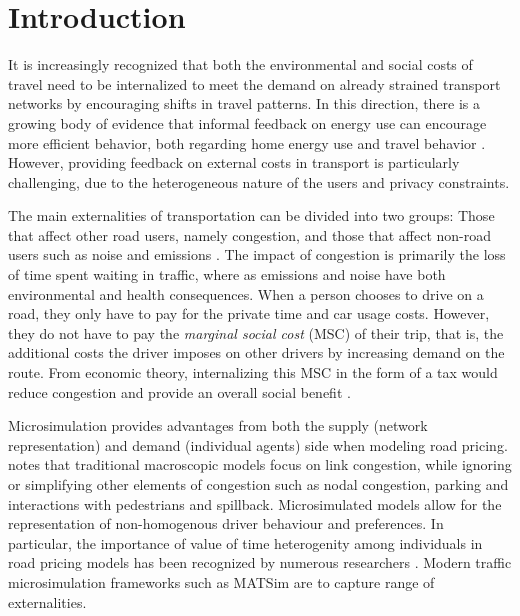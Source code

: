 \section{Introduction}

It is increasingly recognized that both the environmental and social costs of travel need to be internalized to meet the demand on already strained transport networks by encouraging shifts in travel patterns. 
In this direction, there is a growing body of evidence that informal feedback on energy use can encourage more efficient behavior, both regarding home energy use \citep{faruqui2010impact} and travel behavior \citep{taniguchi2003psychological, fujii2006determinants}.
However, providing feedback on external costs in transport is particularly challenging, due to the heterogeneous nature of the users and privacy constraints.

The main externalities of transportation can be divided into two groups: Those that affect other road users, namely congestion, and those that affect non-road users such as noise and emissions \citep{button2004rationale}.
The impact of congestion is primarily the loss of time spent waiting in traffic, where as emissions and noise have both environmental and health consequences.
When a person chooses to drive on a road, they only have to pay for the private time and car usage costs.
However, they do not have to pay the \textit{marginal social cost} (MSC) of their trip, that is, the additional costs the driver imposes on other drivers by increasing demand on the route.
From economic theory, internalizing this MSC in the form of a tax would reduce congestion and provide an overall social benefit \citep{arnott1994economics, pigou2013economics}. 

Microsimulation provides advantages from both the supply (network representation) and demand (individual agents) side when modeling road pricing.
\citet{arnott2001economic} notes that traditional macroscopic models focus on link congestion, while ignoring or simplifying other elements of congestion such as nodal congestion, parking and interactions with pedestrians and spillback.
Microsimulated models allow for the representation of non-homogenous driver behaviour and preferences.
In particular, the importance of value of time heterogenity among individuals in road pricing models has been recognized by numerous researchers \citep{small2001value, verhoef2004product}.
Modern traffic microsimulation frameworks such as MATSim \citep{balmer2009matsim} are to capture range of externalities.

